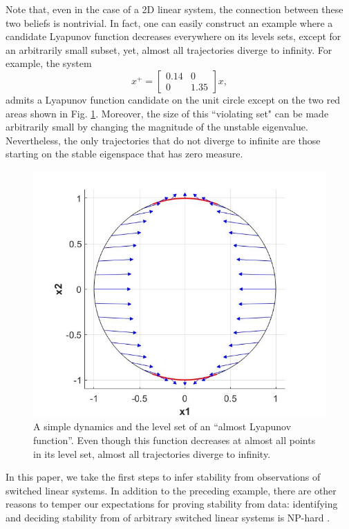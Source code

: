 Note that, even in the case of a 2D linear system, the connection between these two beliefs is nontrivial. In fact, one can easily construct an example where a candidate Lyapunov function decreases everywhere on its levels sets, except for an arbitrarily small subset, yet, almost all trajectories diverge to infinity. For example, the system
\[
x^+ = \begin{bmatrix}
0.14 & 0\\
0 & 1.35
\end{bmatrix}x,
\]
admits a Lyapunov function candidate on the unit circle except on the two red areas shown in Fig. \ref{fig:levelset}.
Moreover, the size of this ``violating set" can be made arbitrarily small by changing the magnitude of the unstable eigenvalue. Nevertheless, the only trajectories that do not diverge to infinite are those starting on the stable eigenspace that has zero measure.
\begin{figure}
\begin{center}
\includegraphics[trim = 15mm 15mm 10mm 10mm, scale=0.3]{ex1.jpg}
\end{center}
\caption{A simple dynamics and the level set of an ``almost Lyapunov function''. Even though this function decreases at almost all points in its level set, almost all trajectories diverge to infinity.}
\label{fig:levelset}
\end{figure}

In this paper, we take the first steps to infer stability from observations of switched linear systems. In addition to the preceding example, there are other reasons to temper our expectations for proving stability from data: identifying and deciding stability from of arbitrary switched linear systems is NP-hard \cite{jungersBook}.

